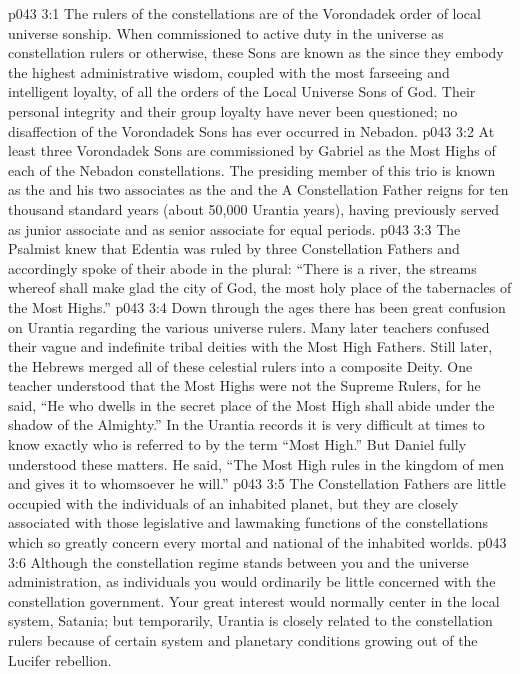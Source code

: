 \vs p043 3:1 The rulers of the constellations are of the Vorondadek order of local universe sonship. When commissioned to active duty in the universe as constellation rulers or otherwise, these Sons are known as the  since they embody the highest administrative wisdom, coupled with the most farseeing and intelligent loyalty, of all the orders of the Local Universe Sons of God. Their personal integrity and their group loyalty have never been questioned; no disaffection of the Vorondadek Sons has ever occurred in Nebadon.
\pc \vs p043 3:2 At least three Vorondadek Sons are commissioned by Gabriel as the Most Highs of each of the Nebadon constellations. The presiding member of this trio is known as the  and his two associates as the  and the  A Constellation Father reigns for ten thousand standard years (about 50,000 Urantia years), having previously served as junior associate and as senior associate for equal periods.
\vs p043 3:3 The Psalmist knew that Edentia was ruled by three Constellation Fathers and accordingly spoke of their abode in the plural: “There is a river, the streams whereof shall make glad the city of God, the most holy place of the tabernacles of the Most Highs.”
\pc \vs p043 3:4 Down through the ages there has been great confusion on Urantia regarding the various universe rulers. Many later teachers confused their vague and indefinite tribal deities with the Most High Fathers. Still later, the Hebrews merged all of these celestial rulers into a composite Deity. One teacher understood that the Most Highs were not the Supreme Rulers, for he said, “He who dwells in the secret place of the Most High shall abide under the shadow of the Almighty.” In the Urantia records it is very difficult at times to know exactly who is referred to by the term “Most High.” But Daniel fully understood these matters. He said, “The Most High rules in the kingdom of men and gives it to whomsoever he will.”
\pc \vs p043 3:5 The Constellation Fathers are little occupied with the individuals of an inhabited planet, but they are closely associated with those legislative and lawmaking functions of the constellations which so greatly concern every mortal  and national  of the inhabited worlds.
\vs p043 3:6 Although the constellation regime stands between you and the universe administration, as individuals you would ordinarily be little concerned with the constellation government. Your great interest would normally center in the local system, Satania; but temporarily, Urantia is closely related to the constellation rulers because of certain system and planetary conditions growing out of the Lucifer rebellion.\plusone
